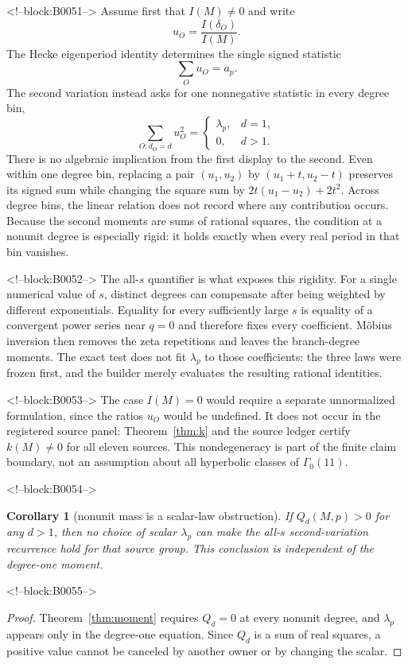 \documentclass[11pt]{article}
\newtheorem{corollary}[theorem]{Corollary}
\theoremstyle{definition}
\theoremstyle{remark}
\newcommand{\G}{\Gamma_0(11)}
\begin{document}
<!--block:B0051-->
Assume first that $I(M)\neq0$ and write
\[
u_O=\frac{I(\delta_O)}{I(M)}.
\]
The Hecke eigenperiod identity determines the single signed statistic
\[
\sum_Ou_O=a_p.
\]
The second variation instead asks for one nonnegative statistic in every degree bin,
\[
\sum_{O:d_O=d}u_O^2=
\begin{cases}
\lambda_p,&d=1,\\
0,&d>1.
\end{cases}
\]
There is no algebraic implication from the first display to the second. Even within one degree bin, replacing a pair $(u_1,u_2)$ by $(u_1+t,u_2-t)$ preserves its signed sum while changing the square sum by $2t(u_1-u_2)+2t^2$. Across degree bins, the linear relation does not record where any contribution occurs. Because the second moments are sums of rational squares, the condition at a nonunit degree is especially rigid: it holds exactly when every real period in that bin vanishes.

<!--block:B0052-->
The all-$s$ quantifier is what exposes this rigidity. For a single numerical value of $s$, distinct degrees can compensate after being weighted by different exponentials. Equality for every sufficiently large $s$ is equality of a convergent power series near $q=0$ and therefore fixes every coefficient. M\"obius inversion then removes the zeta repetitions and leaves the branch-degree moments. The exact test does not fit $\lambda_p$ to those coefficients: the three laws were frozen first, and the builder merely evaluates the resulting rational identities.

<!--block:B0053-->
The case $I(M)=0$ would require a separate unnormalized formulation, since the ratios $u_O$ would be undefined. It does not occur in the registered source panel: Theorem~\ref{thm:k} and the source ledger certify $k(M)\neq0$ for all eleven sources. This nondegeneracy is part of the finite claim boundary, not an assumption about all hyperbolic classes of $\G$.

<!--block:B0054-->
\begin{corollary}[nonunit mass is a scalar-law obstruction]\label{cor:nonunit}
If $Q_d(M,p)>0$ for any $d>1$, then no choice of scalar $\lambda_p$ can make the all-$s$ second-variation recurrence hold for that source group. This conclusion is independent of the degree-one moment.
\end{corollary}

<!--block:B0055-->
\begin{proof}
Theorem~\ref{thm:moment} requires $Q_d=0$ at every nonunit degree, and $\lambda_p$ appears only in the degree-one equation. Since $Q_d$ is a sum of real squares, a positive value cannot be canceled by another owner or by changing the scalar.
\end{proof}
\end{document}
